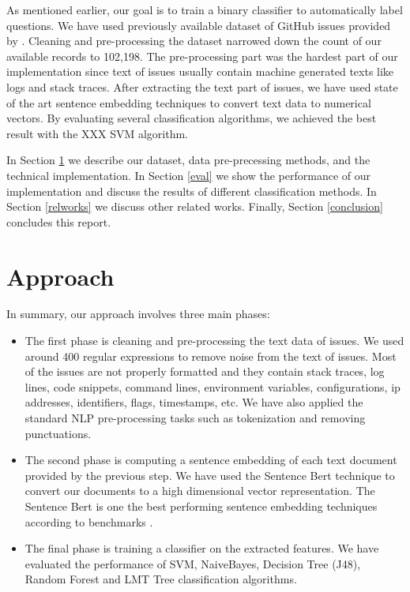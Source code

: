 \documentclass[conference]{IEEEtran}
\begin{document}
As mentioned earlier, our goal is to train a binary classifier to automatically label questions.
We have used previously available dataset of GitHub issues provided by \cite{8816794}.
Cleaning and pre-processing the dataset narrowed down the count of our available 
records to 102,198. The pre-processing part was the hardest part of our implementation
since text of issues usually contain machine generated texts like logs and stack traces. 
After extracting the text part of issues, we have used state of the art sentence embedding techniques
to convert text data to numerical vectors. By evaluating several classification 
algorithms, we achieved the best result with the XXX SVM algorithm.

In Section \ref{approach} we describe our dataset, data pre-precessing methods, 
and the technical implementation. In Section \ref{eval} we show the performance of our implementation
and discuss the results of different classification methods. In Section \ref{relworks} we discuss other 
related works. Finally, Section \ref{conclusion} concludes this report.

\section{Approach}\label{approach}
In summary, our approach involves three main phases:
\begin{itemize}
  \item[1)] The first phase is cleaning and pre-processing the text data of issues. 
  We used around 400 regular expressions to remove noise from the text of issues. 
  Most of the issues are not properly formatted and they contain stack traces, log lines, code snippets, 
  command lines, environment variables, configurations, ip addresses, identifiers, flags, timestamps, etc.
  We have also applied the standard NLP pre-processing tasks such as tokenization and removing punctuations.
  \item[2)] The second phase is computing a sentence embedding of each text document provided by 
  the previous step. We have used the Sentence Bert \cite{reimers-2019-sentence-bert} technique to convert our
  documents to a high dimensional vector representation. The Sentence Bert is one the 
  best performing sentence embedding techniques according to benchmarks \cite{reimers-2019-sentence-bert}.
  \item[3)] The final phase is training a classifier on the extracted features. We have evaluated
  the performance of SVM, NaiveBayes, Decision Tree (J48), Random Forest and LMT Tree 
  classification algorithms.
\end{itemize}
\end{document}
